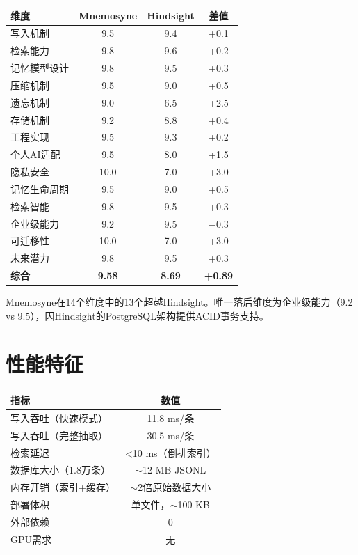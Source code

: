 \documentclass[11pt,a4paper]{ctexart}
\begin{document}
\begin{table}[h]
\centering
\begin{tabular}{lccc}
\toprule
\textbf{维度} & \textbf{Mnemosyne} & \textbf{Hindsight} & \textbf{差值} \\
\midrule
写入机制 & 9.5 & 9.4 & +0.1 \\
检索能力 & 9.8 & 9.6 & +0.2 \\
记忆模型设计 & 9.8 & 9.5 & +0.3 \\
压缩机制 & 9.5 & 9.0 & +0.5 \\
遗忘机制 & 9.0 & 6.5 & +2.5 \\
存储机制 & 9.2 & 8.8 & +0.4 \\
工程实现 & 9.5 & 9.3 & +0.2 \\
个人AI适配 & 9.5 & 8.0 & +1.5 \\
隐私安全 & 10.0 & 7.0 & +3.0 \\
记忆生命周期 & 9.5 & 9.0 & +0.5 \\
检索智能 & 9.8 & 9.5 & +0.3 \\
企业级能力 & 9.2 & 9.5 & $-0.3$ \\
可迁移性 & 10.0 & 7.0 & +3.0 \\
未来潜力 & 9.8 & 9.5 & +0.3 \\
\midrule
\textbf{综合} & \textbf{9.58} & \textbf{8.69} & \textbf{+0.89} \\
\bottomrule
\end{tabular}
\end{table}

Mnemosyne在14个维度中的13个超越Hindsight。唯一落后维度为企业级能力（9.2 vs 9.5），因Hindsight的PostgreSQL架构提供ACID事务支持。

\section{性能特征}

\begin{table}[h]
\centering
\begin{tabular}{lc}
\toprule
\textbf{指标} & \textbf{数值} \\
\midrule
写入吞吐（快速模式） & 11.8 ms/条 \\
写入吞吐（完整抽取） & 30.5 ms/条 \\
检索延迟 & <10 ms（倒排索引） \\
数据库大小（1.8万条） & $\sim$12 MB JSONL \\
内存开销（索引+缓存） & $\sim$2倍原始数据大小 \\
部署体积 & 单文件，$\sim$100 KB \\
外部依赖 & 0 \\
GPU需求 & 无 \\
\bottomrule
\end{tabular}
\end{table}
\end{document}
